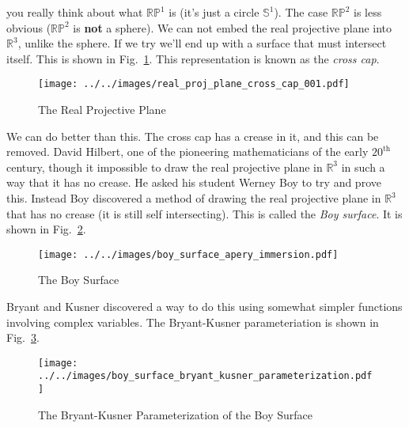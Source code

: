 \documentclass{article}
\theoremstyle{plain}
\theoremstyle{normal}
\begin{document}
        you really think about what $\mathbb{RP}^{1}$ is
        (it's just a circle $\mathbb{S}^{1}$). The case $\mathbb{RP}^{2}$ is
        less obvious ($\mathbb{RP}^{2}$ is \textbf{not} a sphere). We can not
        embed the real projective plane into $\mathbb{R}^{3}$, unlike the
        sphere. If we try we'll end up with a surface that must intersect
        itself. This is shown in
        Fig.~\ref{fig:real_proj_plane_cross_cap_001}. This representation is
        known as the \textit{cross cap}.
        \begin{figure}
            \centering
            \texttt{[image: ../../images/real\_proj\_plane\_cross\_cap\_001.pdf]}
            \caption{The Real Projective Plane}
            \label{fig:real_proj_plane_cross_cap_001}
        \end{figure}
        We can do better than this. The cross cap has a crease in it, and this
        can be removed. David Hilbert, one of the pioneering mathematicians of
        the early $20^{\textrm{th}}$ century, though it impossible to draw the
        real projective plane in $\mathbb{R}^{3}$ in such a way that it has
        no crease. He asked his student Werney Boy to try and prove this.
        Instead Boy discovered a method of drawing the real projective plane
        in $\mathbb{R}^{3}$ that has no crease (it is still self intersecting).
        This is called the \textit{Boy surface}. It is shown in
        Fig.~\ref{fig:boy_surface_apery_immersion}.
        \begin{figure}
            \centering
            \texttt{[image: ../../images/boy\_surface\_apery\_immersion.pdf]}
            \caption{The Boy Surface}
            \label{fig:boy_surface_apery_immersion}
        \end{figure}
        Bryant and Kusner discovered a way to do this using somewhat simpler
        functions involving complex variables. The Bryant-Kusner parameteriation
        is shown in Fig.~\ref{fig:boy_surface_bryant_kusner_parameterization}.
        \begin{figure}
            \centering
            \texttt{[image: ../../images/boy\_surface\_bryant\_kusner\_parameterization.pdf]}
            \caption{The Bryant-Kusner Parameterization of the Boy Surface}
            \label{fig:boy_surface_bryant_kusner_parameterization}
        \end{figure}
\end{document}
